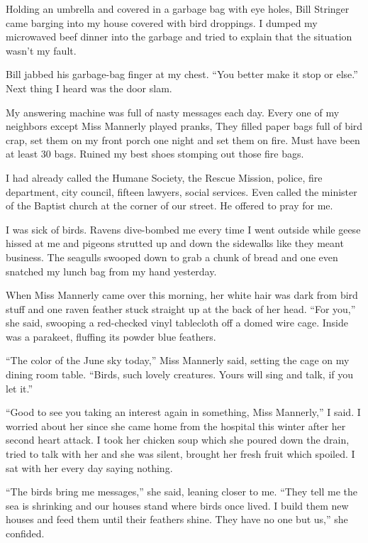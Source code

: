 \documentclass[
]{article}
\begin{document}
Holding an umbrella and covered in a garbage bag with eye holes, Bill
Stringer came barging into my house covered with bird droppings. I
dumped my microwaved beef dinner into the garbage and tried to explain
that the situation wasn't my fault.

Bill jabbed his garbage-bag finger at my chest. ``You better make it
stop or else.'' Next thing I heard was the door slam.

My answering machine was full of nasty messages each day. Every one of
my neighbors except Miss Mannerly played pranks, They filled paper bags
full of bird crap, set them on my front porch one night and set them on
fire. Must have been at least 30 bags. Ruined my best shoes stomping out
those fire bags.

I had already called the Humane Society, the Rescue Mission, police,
fire department, city council, fifteen lawyers, social services. Even
called the minister of the Baptist church at the corner of our street.
He offered to pray for me.

I was sick of birds. Ravens dive-bombed me every time I went outside
while geese hissed at me and pigeons strutted up and down the sidewalks
like they meant business. The seagulls swooped down to grab a chunk of
bread and one even snatched my lunch bag from my hand yesterday.

When Miss Mannerly came over this morning, her white hair was dark from
bird stuff and one raven feather stuck straight up at the back of her
head. ``For you,'' she said, swooping a red-checked vinyl tablecloth off
a domed wire cage. Inside was a parakeet, fluffing its powder blue
feathers.

``The color of the June sky today,'' Miss Mannerly said, setting the
cage on my dining room table. ``Birds, such lovely creatures. Yours will
sing and talk, if you let it.''

``Good to see you taking an interest again in something, Miss
Mannerly,'' I said. I worried about her since she came home from the
hospital this winter after her second heart attack. I took her chicken
soup which she poured down the drain, tried to talk with her and she was
silent, brought her fresh fruit which spoiled. I sat with her every day
saying nothing.

``The birds bring me messages,'' she said, leaning closer to me. ``They
tell me the sea is shrink­ing and our houses stand where birds once
lived. I build them new houses and feed them until their feathers shine.
They have no one but us,'' she confided.
\end{document}
